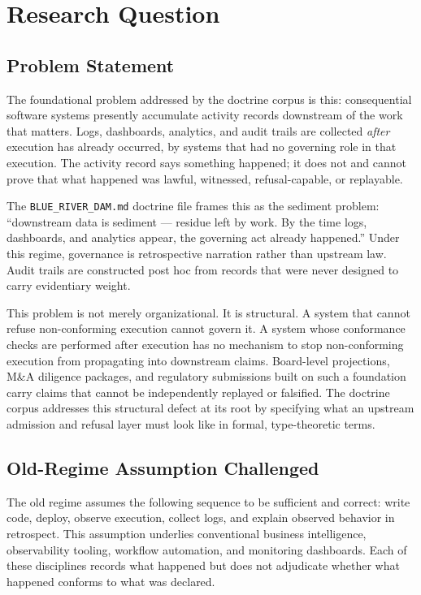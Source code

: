 \section{Research Question}
\label{sec:doctrine-question}

\subsection{Problem Statement}
\label{sec:doctrine-question-problem}

The foundational problem addressed by the doctrine corpus is this: consequential software
systems presently accumulate activity records downstream of the work that matters. Logs,
dashboards, analytics, and audit trails are collected \emph{after} execution has already
occurred, by systems that had no governing role in that execution. The activity record says
something happened; it does not and cannot prove that what happened was lawful, witnessed,
refusal-capable, or replayable.

The \texttt{BLUE\_RIVER\_DAM.md} doctrine file frames this as the sediment problem:
``downstream data is sediment --- residue left by work. By the time logs, dashboards, and
analytics appear, the governing act already happened.'' Under this regime, governance is
retrospective narration rather than upstream law. Audit trails are constructed post hoc from
records that were never designed to carry evidentiary weight.

This problem is not merely organizational. It is structural. A system that cannot refuse
non-conforming execution cannot govern it. A system whose conformance checks are performed
after execution has no mechanism to stop non-conforming execution from propagating into
downstream claims. Board-level projections, M\&A diligence packages, and regulatory
submissions built on such a foundation carry claims that cannot be independently replayed or
falsified. The doctrine corpus addresses this structural defect at its root by specifying
what an upstream admission and refusal layer must look like in formal, type-theoretic terms.

\subsection{Old-Regime Assumption Challenged}
\label{sec:doctrine-question-old-regime}

The old regime assumes the following sequence to be sufficient and correct: write code,
deploy, observe execution, collect logs, and explain observed behavior in retrospect. This
assumption underlies conventional business intelligence, observability tooling, workflow
automation, and monitoring dashboards. Each of these disciplines records what happened but
does not adjudicate whether what happened conforms to what was declared.

